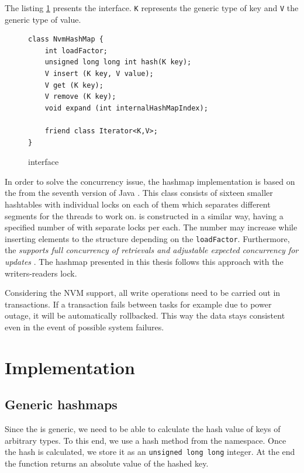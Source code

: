     The listing \ref{NvmHashMap} presents the \NvmHashMap interface. 
    \texttt{K} represents the generic type of key and \texttt{V} the generic type of value. 
    
\begin{figure}[ht] 
\renewcommand{\figurename}{Listing}
    \begin{lstlisting}
class NvmHashMap {
    int loadFactor;
    unsigned long long int hash(K key);
    V insert (K key, V value);
    V get (K key);
    V remove (K key);
    void expand (int internalHashMapIndex);
    
    friend class Iterator<K,V>;
}
    \end{lstlisting}
\label{NvmHashMap}
\caption{\NvmHashMap interface}
\end{figure}
    In order to solve the concurrency issue, the hashmap implementation is based on the \ConcurrentHashMap from the seventh version of Java \cite{ConcurrentHashMapJava}. 
    This class consists of sixteen smaller hashtables with individual locks on each of them which separates different segments for the threads to work on.
    \NvmHashMap is constructed in a similar way, having a specified number of \internalHashMaps with separate locks per each.
    The number may increase while inserting elements to the structure depending on the \texttt{loadFactor}.
    Furthermore, the \ConcurrentHashMap \textit{supports full concurrency of retrievals and adjustable expected concurrency for updates} \cite{ConcurrentHashMapJava}. 
    The hashmap presented in this thesis follows this approach with the writers-readers lock.
    
    Considering the NVM support, all write operations need to be carried out in transactions. 
    If a transaction fails between tasks for example due to power outage, it will be automatically rollbacked.
    This way the data stays consistent even in the event of possible system failures.

\section{Implementation}

    \subsection{Generic hashmaps} 
        Since the \NvmHashMap is generic, we need to be able to calculate the hash value of keys of arbitrary types. 
        To this end, we use a hash method from the \std namespace. 
        Once the hash is calculated, we store it as an \texttt{unsigned long long} integer.
        At the end the function returns an absolute value of the hashed key.
        
